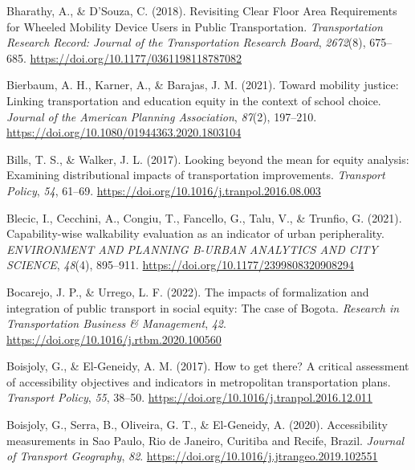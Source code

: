 \documentclass[
  letterpaper,
  DIV=11,
  numbers=noendperiod]{scrartcl}
\newlength{\cslhangindent}
\newenvironment{CSLReferences}[2] %
 {\begin{list}{}{%
  \setlength{\itemindent}{0pt}
  \setlength{\leftmargin}{0pt}
  \setlength{\parsep}{0pt}
  \ifodd #1
   \setlength{\leftmargin}{\cslhangindent}
   \setlength{\itemindent}{-1\cslhangindent}
  \fi
  \setlength{\itemsep}{#2\baselineskip}}}
 {\end{list}}
\begin{document}
\begin{CSLReferences}{1}{0}
Bharathy, A., \& D'Souza, C. (2018). Revisiting {Clear Floor Area
Requirements} for {Wheeled Mobility Device Users} in {Public
Transportation}. \emph{Transportation Research Record: Journal of the
Transportation Research Board}, \emph{2672}(8), 675--685.
\url{https://doi.org/10.1177/0361198118787082}

Bierbaum, A. H., Karner, A., \& Barajas, J. M. (2021). Toward mobility
justice: Linking transportation and education equity in the context of
school choice. \emph{Journal of the American Planning Association},
\emph{87}(2), 197--210.
\url{https://doi.org/10.1080/01944363.2020.1803104}

Bills, T. S., \& Walker, J. L. (2017). Looking beyond the mean for
equity analysis: Examining distributional impacts of transportation
improvements. \emph{Transport Policy}, \emph{54}, 61--69.
\url{https://doi.org/10.1016/j.tranpol.2016.08.003}

Blecic, I., Cecchini, A., Congiu, T., Fancello, G., Talu, V., \&
Trunfio, G. (2021). Capability-wise walkability evaluation as an
indicator of urban peripherality. \emph{ENVIRONMENT AND PLANNING B-URBAN
ANALYTICS AND CITY SCIENCE}, \emph{48}(4), 895--911.
\url{https://doi.org/10.1177/2399808320908294}

Bocarejo, J. P., \& Urrego, L. F. (2022). The impacts of formalization
and integration of public transport in social equity: {The} case of
{Bogota}. \emph{Research in Transportation Business \& Management},
\emph{42}. \url{https://doi.org/10.1016/j.rtbm.2020.100560}

Boisjoly, G., \& El-Geneidy, A. M. (2017). How to get there? {A}
critical assessment of accessibility objectives and indicators in
metropolitan transportation plans. \emph{Transport Policy}, \emph{55},
38--50. \url{https://doi.org/10.1016/j.tranpol.2016.12.011}

Boisjoly, G., Serra, B., Oliveira, G. T., \& El-Geneidy, A. (2020).
Accessibility measurements in {Sao Paulo}, {Rio} de {Janeiro},
{Curitiba} and {Recife}, {Brazil}. \emph{Journal of Transport
Geography}, \emph{82}.
\url{https://doi.org/10.1016/j.jtrangeo.2019.102551}


\end{CSLReferences}
\end{document}
